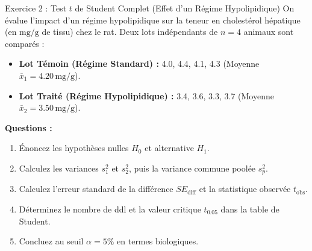 \documentclass[11pt,a4paper]{article}
\begin{document}
\begin{exercicebox}{Exercice 2 : Test $t$ de Student Complet (Effet d'un Régime Hypolipidique)}
On évalue l'impact d'un régime hypolipidique sur la teneur en cholestérol hépatique (en $\text{mg/g}$ de tissu) chez le rat. Deux lots indépendants de $n = 4$ animaux sont comparés :
\begin{itemize}
  \item \textbf{Lot Témoin (Régime Standard) :} 4.0, 4.4, 4.1, 4.3 (Moyenne $\bar{x}_1 = 4.20\,\text{mg/g}$).
  \item \textbf{Lot Traité (Régime Hypolipidique) :} 3.4, 3.6, 3.3, 3.7 (Moyenne $\bar{x}_2 = 3.50\,\text{mg/g}$).
\end{itemize}
\textbf{Questions :}
\begin{enumerate}[label=\textbf{\alph*.}]
  \item Énoncez les hypothèses nulles $H_0$ et alternative $H_1$.
  \item Calculez les variances $s_1^2$ et $s_2^2$, puis la variance commune poolée $s_p^2$.
  \item Calculez l'erreur standard de la différence $SE_{\text{diff}}$ et la statistique observée $t_{\text{obs}}$.
  \item Déterminez le nombre de ddl et la valeur critique $t_{0.05}$ dans la table de Student.
  \item Concluez au seuil $\alpha = 5\%$ en termes biologiques.
\end{enumerate}
\end{exercicebox}
\end{document}
